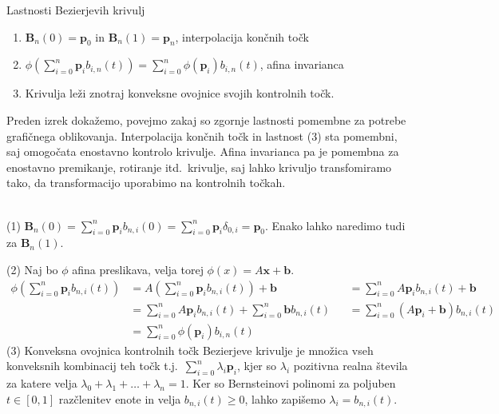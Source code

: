 \documentclass[isrm2, tisk]{fmfdelo}
\newcommand{\p}{\textbf{p}}
\newcommand{\lilb}[2]{b_{#1,#2}(t)}
\newcommand{\bigbbod}[2]{\textbf{B}_{#1}(#2)}
\newcommand{\bernsteinsump}[2]{\sum_{#1=0}^{#2} \p_{#1}\lilb{#1}{#2}}
\newcommand{\bernsteinsumtritri}[3]{\sum_{#1=0}^{#2} #3\lilb{#1}{#2}}
\begin{document}
    \begin{izrek}{Lastnosti Bezierjevih krivulj}
        \label{izrek:lastnosti-bezierjevih-krivulj}
        \begin{enumerate}
            \item $\bigbbod{n}{0}=\p_0$ in $\bigbbod{n}{1}=\p_n$, interpolacija končnih točk
            \item $\phi(\bernsteinsump{i}{n}) =\bernsteinsumtritri{i}{n}{\phi(\p_i)}$, afina invarianca
            \item Krivulja leži znotraj konveksne ovojnice svojih kontrolnih točk.
        \end{enumerate}
    \end{izrek}
    Preden izrek dokažemo, povejmo zakaj so zgornje lastnosti pomembne za potrebe grafičnega oblikovanja.
    Interpolacija končnih točk in lastnost (3) sta pomembni, saj omogočata enostavno kontrolo krivulje.
    Afina invarianca pa je pomembna za enostavno premikanje, rotiranje itd.\ krivulje, saj lahko krivuljo transfomiramo tako, da transformacijo uporabimo na kontrolnih točkah.


    \begin{dokaz}
        ~\\
        \noindent (1) $\bigbbod{n}{0}=\sum_{i=0}^{n}\p_{i}b_{n,i}(0) = \sum_{i=0}^{n}\p_{i}\delta_{0,i} = \p_0$.
        Enako lahko naredimo tudi za $\bigbbod{n}{1}.$

        \noindent (2) Naj bo $\phi$ afina preslikava, velja torej $\phi(x) = A\mathbf{x} + \mathbf{b}.$
        \begin{align*}
            \phi\left(\sum_{i=0}^{n}\p_{i}b_{n,i}(t)\right) &= A\left(\sum_{i=0}^{n}\p_{i}b_{n,i}(t)\right) + \mathbf{b} &&=  \sum_{i=0}^{n}A\p_{i}b_{n,i}(t) + \mathbf{b}  \\
            &= \sum_{i=0}^{n}A\p_{i}b_{n,i}(t) + \sum_{i=0}^{n}\mathbf{b}b_{n,i}(t) &&= \sum_{i=0}^{n}(A\p_{i}+\mathbf{b})b_{n,i}(t) \\
            &= \bernsteinsumtritri{i}{n}{\phi(\p_i)}
        \end{align*}
        \noindent (3) Konveksna ovojnica kontrolnih točk Bezierjeve krivulje je množica vseh konveksnih kombinacij teh točk t.j.\ $\sum_{i=0}^{n}\lambda_i\p_{i}$, kjer so $\lambda_i$ pozitivna realna števila za katere velja $\lambda_0 + \lambda_1 + \dots + \lambda_n = 1$.
        Ker so Bernsteinovi polinomi za poljuben $t\in[0,1]$ razčlenitev enote in velja $\lilb{n}{i}\geq0$, lahko zapišemo $\lambda_i=\lilb{n}{i}$.
    \end{dokaz}
\end{document}
